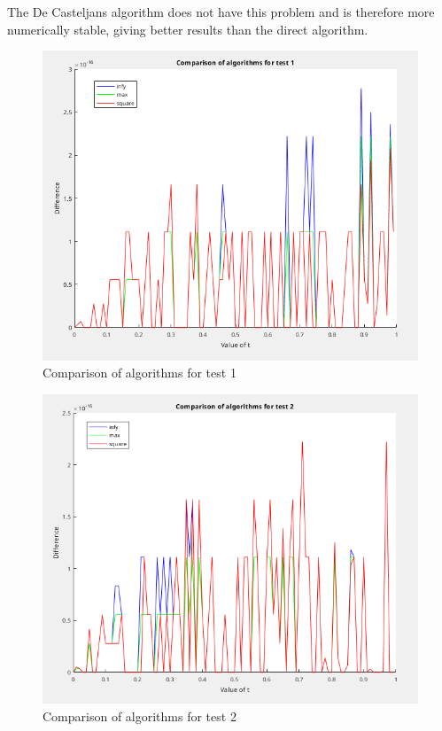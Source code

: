 \documentclass[]{article}
\begin{document}
The De Casteljans algorithm does not have this problem and is therefore more
numerically stable, giving better results than the direct algorithm.

\begin{figure}
  \centering
  \includegraphics[width=0.8\linewidth]{figs/test01.png}
  \caption{Comparison of algorithms for test 1}
  \label{fig:01}
\end{figure}

\begin{figure}
  \centering
  \includegraphics[width=0.8\linewidth]{figs/test02.png}
  \caption{Comparison of algorithms for test 2}
  \label{fig:02}
\end{figure}
\end{document}
